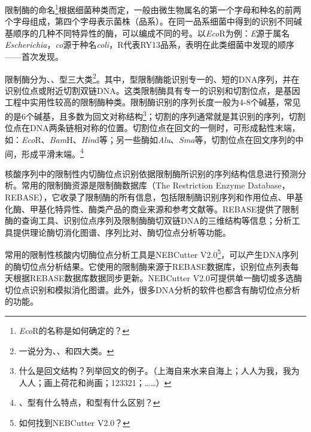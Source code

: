 \documentclass[11pt,a4paper,twoside]{book}
\begin{document}
限制酶的命名\footnote{\textit{Eco}R的名称是如何确定的？}根据细菌种类而定，一般由微生物属名的第一个字母和种名的前两个字母组成，第四个字母表示菌株（品系）。在同一品系细菌中得到的识别不同碱基顺序的几种不同特异性的酶，可以编成不同的号。以\textit{Eco}R为例：\textit{E}源于属名\textit{Escherichia}，\textit{co}源于种名\textit{coli}，R代表RY13品系，表明在此类细菌中发现的顺序——首次发现。

限制酶分为、、型三大类\footnote{一说分为、、和四大类。}。其中，型限制酶能识别专一的、短的DNA序列，并在识别位点或附近切割双链DNA。这类限制酶具有专一的识别和切割位点，是基因工程中实用性较高的限制酶种类。限制酶识别的序列长度一般为4-8个碱基，常见的是6个碱基，且多数为回文对称结构\footnote{什么是回文结构？列举回文的例子。（上海自来水来自海上；人人为我，我为人人；画上荷花和尚画；123321；……）}；切割的序列通常就是其识别的序列，切割位点在DNA两条链相对称的位置。切割位点在回文的一侧时，可形成黏性末端，如：\textit{Eco}R、\textit{Bam}H、\textit{Hin}d等；另一些酶如\textit{Alu}、\textit{Sma}等，切割位点在回文序列的中间，形成平滑末端。\footnote{、型有什么特点，和型有什么区别？}

核酸序列中的限制性内切酶位点识别依据限制酶所识别的序列结构信息进行预测分析。常用的限制酶资源是限制酶数据库（The Restriction Enzyme Database，REBASE），它收录了限制酶的所有信息，包括限制酶识别序列和作用位点、甲基化酶、甲基化特异性、酶类产品的商业来源和参考文献等。REBASE提供了限制酶的查询工具、识别位点序列及限制酶酶切双链DNA的三维结构等信息；分析工具提供理论酶切消化图谱、序列比对、酶切位点分析等功能。

常用的限制性核酸内切酶位点分析工具是NEBCutter V2.0\footnote{如何找到NEBCutter V2.0？}，可以产生DNA序列的酶切位点分析结果。它使用的限制酶来源于REBASE数据库，识别位点列表每天根据REBASE数据库数据同步更新。NEBCutter V2.0可提供单一酶切或多选酶切位点识别和模拟消化图谱。此外，很多DNA分析的软件也都含有酶切位点分析的功能。
\end{document}
